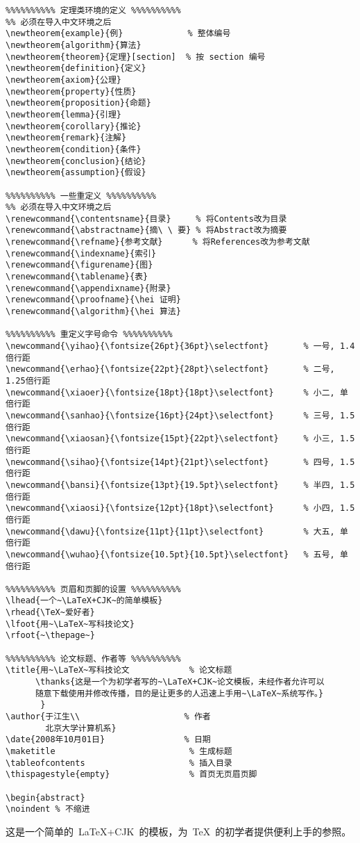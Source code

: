 \begin{verbatim}
%%%%%%%%%% 定理类环境的定义 %%%%%%%%%%
%% 必须在导入中文环境之后
\newtheorem{example}{例}             % 整体编号
\newtheorem{algorithm}{算法}
\newtheorem{theorem}{定理}[section]  % 按 section 编号
\newtheorem{definition}{定义}
\newtheorem{axiom}{公理}
\newtheorem{property}{性质}
\newtheorem{proposition}{命题}
\newtheorem{lemma}{引理}
\newtheorem{corollary}{推论}
\newtheorem{remark}{注解}
\newtheorem{condition}{条件}
\newtheorem{conclusion}{结论}
\newtheorem{assumption}{假设}

%%%%%%%%%% 一些重定义 %%%%%%%%%%
%% 必须在导入中文环境之后
\renewcommand{\contentsname}{目录}     % 将Contents改为目录
\renewcommand{\abstractname}{摘\ \ 要} % 将Abstract改为摘要
\renewcommand{\refname}{参考文献}      % 将References改为参考文献
\renewcommand{\indexname}{索引}
\renewcommand{\figurename}{图}
\renewcommand{\tablename}{表}
\renewcommand{\appendixname}{附录}
\renewcommand{\proofname}{\hei 证明}
\renewcommand{\algorithm}{\hei 算法}

%%%%%%%%%% 重定义字号命令 %%%%%%%%%%
\newcommand{\yihao}{\fontsize{26pt}{36pt}\selectfont}       % 一号, 1.4倍行距
\newcommand{\erhao}{\fontsize{22pt}{28pt}\selectfont}       % 二号, 1.25倍行距
\newcommand{\xiaoer}{\fontsize{18pt}{18pt}\selectfont}      % 小二, 单倍行距
\newcommand{\sanhao}{\fontsize{16pt}{24pt}\selectfont}      % 三号, 1.5倍行距
\newcommand{\xiaosan}{\fontsize{15pt}{22pt}\selectfont}     % 小三, 1.5倍行距
\newcommand{\sihao}{\fontsize{14pt}{21pt}\selectfont}       % 四号, 1.5倍行距
\newcommand{\bansi}{\fontsize{13pt}{19.5pt}\selectfont}     % 半四, 1.5倍行距
\newcommand{\xiaosi}{\fontsize{12pt}{18pt}\selectfont}      % 小四, 1.5倍行距
\newcommand{\dawu}{\fontsize{11pt}{11pt}\selectfont}        % 大五, 单倍行距
\newcommand{\wuhao}{\fontsize{10.5pt}{10.5pt}\selectfont}   % 五号, 单倍行距

%%%%%%%%%% 页眉和页脚的设置 %%%%%%%%%%
\lhead{一个~\LaTeX+CJK~的简单模板}
\rhead{\TeX~爱好者}
\lfoot{用~\LaTeX~写科技论文}
\rfoot{~\thepage~}

%%%%%%%%%% 论文标题、作者等 %%%%%%%%%%
\title{用~\LaTeX~写科技论文            % 论文标题
      \thanks{这是一个为初学者写的~\LaTeX+CJK~论文模板，未经作者允许可以
      随意下载使用并修改传播，目的是让更多的人迅速上手用~\LaTeX~系统写作。}
       }
\author{于江生\\                     % 作者
        北京大学计算机系}
\date{2008年10月01日}                % 日期
\maketitle                           % 生成标题
\tableofcontents                     % 插入目录
\thispagestyle{empty}                % 首页无页眉页脚

\begin{abstract}
\noindent % 不缩进
\end{verbatim}

这是一个简单的~\LaTeX+CJK~的模板，为~\TeX~的初学者提供便利上手的参照。